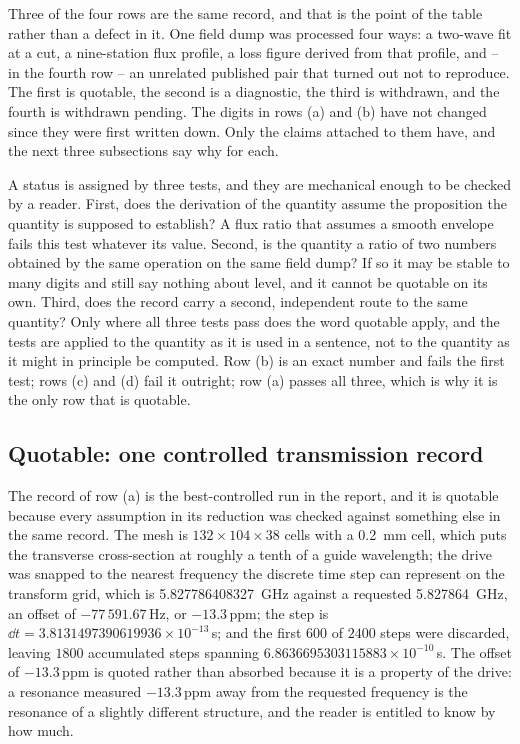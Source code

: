 Three of the four rows are the same record, and that is the point of the table rather than a defect in it. One
field dump was processed four ways: a two-wave fit at a cut, a nine-station flux profile, a loss figure derived
from that profile, and -- in the fourth row -- an unrelated published pair that turned out not to reproduce. The
first is quotable, the second is a diagnostic, the third is withdrawn, and the fourth is withdrawn pending. The
digits in rows (a) and (b) have not changed since they were first written down. Only the claims attached to them
have, and the next three subsections say why for each.

A status is assigned by three tests, and they are mechanical enough to be checked by a reader. First, does the
derivation of the quantity assume the proposition the quantity is supposed to establish? A flux ratio that
assumes a smooth envelope fails this test whatever its value. Second, is the quantity a ratio of two numbers
obtained by the same operation on the same field dump? If so it may be stable to many digits and still say
nothing about level, and it cannot be quotable on its own. Third, does the record carry a second, independent
route to the same quantity? Only where all three tests pass does the word quotable apply, and the tests are
applied to the quantity as it is used in a sentence, not to the quantity as it might in principle be computed.
Row (b) is an exact number and fails the first test; rows (c) and (d) fail it outright; row (a) passes all
three, which is why it is the only row that is quotable.

\subsection{Quotable: one controlled transmission record}
\label{sec:worked-cw}

The record of row (a) is the best-controlled run in the report, and it is quotable because every assumption in
its reduction was checked against something else in the same record. The mesh is $132\times104\times38$ cells
with a \SI{0.2}{mm} cell, which puts the transverse cross-section at roughly a tenth of a guide wavelength; the
drive was snapped to the nearest frequency the discrete time step can represent on the transform grid, which is
\SI{5.827786408327}{\giga\hertz} against a requested \SI{5.827864}{\giga\hertz}, an offset of
$-77\,591.67$\,Hz, or $-13.3$\,ppm; the step is $\dd t = 3.8131497390619936\times10^{-13}$\,s; and the first
$600$ of $2400$ steps were discarded, leaving $1800$ accumulated steps spanning $6.8636695303115883\times10^{-10}$\,s.
The offset of $-13.3$\,ppm is quoted rather than absorbed because it is a property of the drive: a resonance
measured $-13.3$\,ppm away from the requested frequency is the resonance of a slightly different structure,
and the reader is entitled to know by how much.

